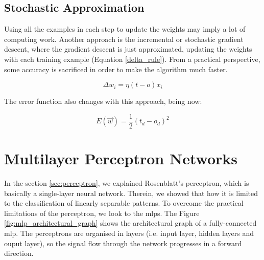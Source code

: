 	\subsection{Stochastic Approximation}
	Using all the examples in each step to update the weights may imply a lot of computing work. Another approach is the incremental or stochastic gradient descent, where the gradient descent is just approximated, updating the weights with each training example (Equation \ref{delta_rule}). From a practical perspective, some accuracy is sacrificed in order to make the algorithm much faster.

	\begin{equation}
		\label{delta_rule}
		\Delta w_{i}= \eta (t - o) x_{i}
	\end{equation}

	The error function also changes with this approach, being now:

	\begin{equation}
		\label{error_function_stoc_square}
		E(\vec{w}) = \frac{1}{2} (t_d-o_d)^2 
	\end{equation}



                                                                              

\section{Multilayer Perceptron Networks}
In the section \ref{sec:perceptron}, we explained Rosenblatt’s perceptron, which is basically a single-layer neural network. Therein, we showed that how it is limited to the classification of linearly separable patterns. To overcome the practical limitations of the perceptron, we look to the \glspl{mlp}. The Figure \ref{fig:mlp_architectural_graph} shows the architectural graph of a fully-connected \gls{mlp}. The perceptrons are organised in layers (i.e. input layer, hidden layers and ouput layer), so the signal flow through the network progresses in a forward direction.

